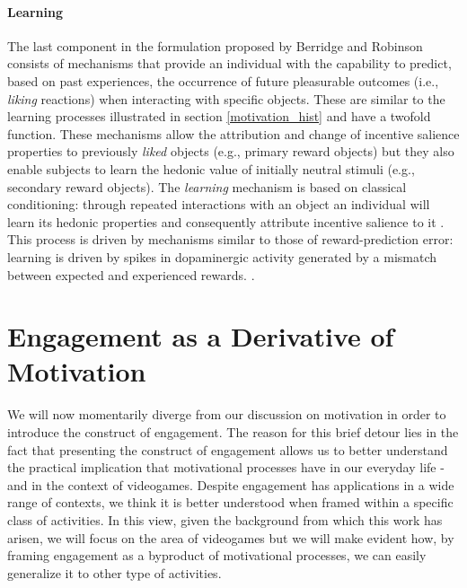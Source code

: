 \paragraph*{Learning}
\label{learning}
The last component in the formulation proposed by Berridge and Robinson \cite{berridge1998role,berridge2004motivation} consists of mechanisms that provide an individual with the capability to predict, based on past experiences, the occurrence of future pleasurable outcomes (i.e., \emph{liking} reactions) when interacting with specific objects. These are similar to the learning processes illustrated in section \ref{motivation_hist} and have a twofold function. These mechanisms allow the attribution and change of incentive salience properties to previously \emph{liked} objects (e.g., primary reward objects) but they also enable subjects to learn the hedonic value of initially neutral stimuli (e.g., secondary reward objects). The \emph{learning} mechanism is based on classical conditioning: through repeated interactions with an object an individual will learn its hedonic properties and consequently attribute incentive salience to it \cite{berridge2004motivation,berridge2009dissecting}. This process is driven by mechanisms similar to those of reward-prediction error: learning is driven by spikes in dopaminergic activity generated by a mismatch between expected and experienced rewards. \cite{schultz1997neural,schultz2000multiple,flagel2011selective}.

\section{Engagement as a Derivative of Motivation}
\label{engagement}
We will now momentarily diverge from our discussion on motivation in order to introduce the construct of engagement. The reason for this brief detour lies in the fact that presenting the construct of engagement allows us to better understand the practical implication that motivational processes have in our everyday life - and in the context of videogames. Despite engagement has applications in a wide range of contexts, we think it is better understood when framed within a specific class of activities. In this view, given the background from which this work has arisen, we will focus on the area of videogames but we will make evident how, by framing engagement as a byproduct of motivational processes, we can easily generalize it to other type of activities.

